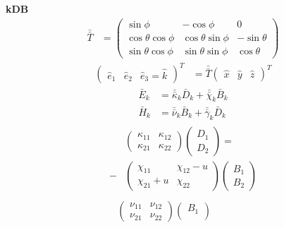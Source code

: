 \documentclass[12pt]{article}
\begin{document}
\begin{multicols}{3}
\textbf{kDB}
\begin{align}
  \bar{\bar{T}} &=
  \begin{pmatrix}
    \sin\phi & -\cos\phi & 0\\
    \cos\theta\cos\phi & \cos\theta\sin\phi & -\sin\theta\\
    \sin\theta\cos\phi & \sin\theta\sin\phi & \cos\theta
  \end{pmatrix} %
\end{align}
\begin{align}
  \begin{pmatrix} \hat{e}_1 & \hat{e}_2 & \hat{e}_3=\hat{k}\end{pmatrix}^T &= \bar{\bar{T}}
  \begin{pmatrix} \hat{x} & \hat{y} & \hat{z}\end{pmatrix}^T
\end{align}
\begin{align}
  \bar{E}_k &= \bar{\bar{\kappa}}_k \bar{D}_k + \bar{\bar{\chi}}_k \bar{B}_k\\
  \bar{H}_k &= \bar{\bar{\nu}}_k \bar{B}_k + \bar{\bar{\gamma}}_k \bar{D}_k
\end{align}
\begin{align}
  \begin{split}
  &\begin{pmatrix}
    \kappa_{11} & \kappa_{12}\\
    \kappa_{21} & \kappa_{22}
  \end{pmatrix}
  {}\begin{pmatrix}
    D_1\\
    D_2
  \end{pmatrix} =\\
  -&\begin{pmatrix}
    \chi_{11} & \chi_{12} - u\\
    \chi_{21} + u & \chi_{22}
  \end{pmatrix}
  \begin{pmatrix}
    B_1\\
    B_2
  \end{pmatrix}
  \end{split}\\
  \begin{split}
  &\begin{pmatrix}
    \nu_{11} & \nu_{12}\\
    \nu_{21} & \nu_{22}
  \end{pmatrix}
  {}\begin{pmatrix}
    B_1\\

\end{pmatrix}
\end{split}
\end{align}
\end{multicols}
\end{document}
